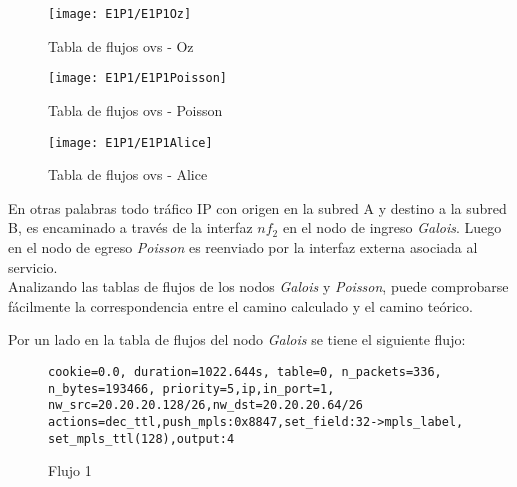 \begin{figure}[h!] 
\centering    
\texttt{[image: E1P1/E1P1Oz]}
\caption[Tabla de flujos ovs - Oz]{Tabla de flujos ovs - Oz}
\label{fig:CU1P1DumpFlows2}
\end{figure}

\begin{figure}[h!] 
\centering    
\texttt{[image: E1P1/E1P1Poisson]}
\caption[Tabla de flujos ovs - Poisson]{Tabla de flujos ovs - Poisson}
\label{fig:CU1P1DumpFlows3}
\end{figure}

\begin{figure}[h!] 
\centering    
\texttt{[image: E1P1/E1P1Alice]}
\caption[Tabla de flujos ovs - Alice]{Tabla de flujos ovs - Alice}
\label{fig:CU1P1DumpFlows4}
\end{figure}


\newpage
En otras palabras todo tr\'afico IP con origen en la subred A y destino a la subred B, es encaminado a través de la interfaz $nf_2$ en el nodo de ingreso \textit{Galois}. Luego en el nodo de egreso \textit{Poisson} es reenviado por la interfaz externa asociada al servicio.\\

Analizando las tablas de flujos de los nodos \textit{Galois} y \textit{Poisson}, puede comprobarse fácilmente la correspondencia entre el camino calculado y el camino te\'orico.

Por un lado en la tabla de flujos del nodo \textit{Galois} se tiene el siguiente flujo:


\begin{figure}[h]
\texttt{cookie=0.0, duration=1022.644s, table=0, n\_packets=336, \\ 
n\_bytes=193466, priority=5,ip,in\_port=1, \\
nw\_src=20.20.20.128/26,nw\_dst=20.20.20.64/26 \\
actions=dec\_ttl,push\_mpls:0x8847,set\_field:32->mpls\_label, \\
set\_mpls\_ttl(128),output:4}
\centering
\caption{Flujo 1}
\label{fig:Flujo1}
\end{figure}

